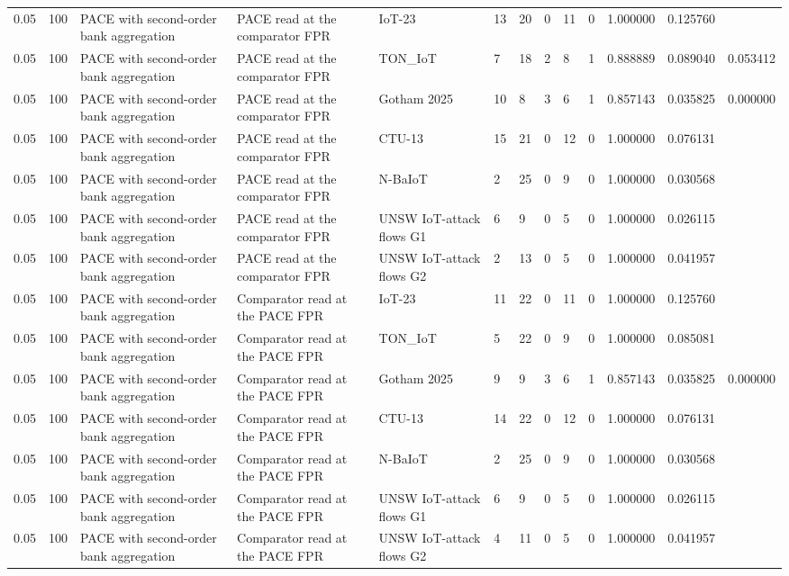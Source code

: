 \begin{tabular}{lllllllllllll}
0.05 & 100 & PACE with second-order bank aggregation & PACE read at the comparator FPR & IoT-23 & 13 & 20 & 0 & 11 & 0 & 1.000000 & 0.125760 &  \\
0.05 & 100 & PACE with second-order bank aggregation & PACE read at the comparator FPR & TON\_IoT & 7 & 18 & 2 & 8 & 1 & 0.888889 & 0.089040 & 0.053412 \\
0.05 & 100 & PACE with second-order bank aggregation & PACE read at the comparator FPR & Gotham 2025 & 10 & 8 & 3 & 6 & 1 & 0.857143 & 0.035825 & 0.000000 \\
0.05 & 100 & PACE with second-order bank aggregation & PACE read at the comparator FPR & CTU-13 & 15 & 21 & 0 & 12 & 0 & 1.000000 & 0.076131 &  \\
0.05 & 100 & PACE with second-order bank aggregation & PACE read at the comparator FPR & N-BaIoT & 2 & 25 & 0 & 9 & 0 & 1.000000 & 0.030568 &  \\
0.05 & 100 & PACE with second-order bank aggregation & PACE read at the comparator FPR & UNSW IoT-attack flows G1 & 6 & 9 & 0 & 5 & 0 & 1.000000 & 0.026115 &  \\
0.05 & 100 & PACE with second-order bank aggregation & PACE read at the comparator FPR & UNSW IoT-attack flows G2 & 2 & 13 & 0 & 5 & 0 & 1.000000 & 0.041957 &  \\
0.05 & 100 & PACE with second-order bank aggregation & Comparator read at the PACE FPR & IoT-23 & 11 & 22 & 0 & 11 & 0 & 1.000000 & 0.125760 &  \\
0.05 & 100 & PACE with second-order bank aggregation & Comparator read at the PACE FPR & TON\_IoT & 5 & 22 & 0 & 9 & 0 & 1.000000 & 0.085081 &  \\
0.05 & 100 & PACE with second-order bank aggregation & Comparator read at the PACE FPR & Gotham 2025 & 9 & 9 & 3 & 6 & 1 & 0.857143 & 0.035825 & 0.000000 \\
0.05 & 100 & PACE with second-order bank aggregation & Comparator read at the PACE FPR & CTU-13 & 14 & 22 & 0 & 12 & 0 & 1.000000 & 0.076131 &  \\
0.05 & 100 & PACE with second-order bank aggregation & Comparator read at the PACE FPR & N-BaIoT & 2 & 25 & 0 & 9 & 0 & 1.000000 & 0.030568 &  \\
0.05 & 100 & PACE with second-order bank aggregation & Comparator read at the PACE FPR & UNSW IoT-attack flows G1 & 6 & 9 & 0 & 5 & 0 & 1.000000 & 0.026115 &  \\
0.05 & 100 & PACE with second-order bank aggregation & Comparator read at the PACE FPR & UNSW IoT-attack flows G2 & 4 & 11 & 0 & 5 & 0 & 1.000000 & 0.041957 &  \\

\end{tabular}
